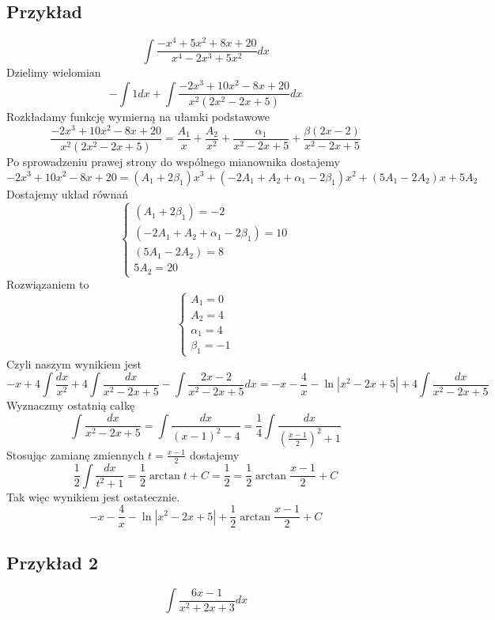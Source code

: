 \documentclass[11pt]{article}
\begin{document}
\subsection{Przykład}
$$\int \frac{-x^4 + 5x^2 + 8x + 20}{x^4 - 2x^3 + 5x^2}dx$$
Dzielimy wielomian
$$-\int1dx + \int \frac{-2x^3 + 10x^2 - 8x +20}{x^2(2x^2 -2x +5)}dx $$
Rozkładamy funkcję wymierną na ułamki podstawowe
$$\frac{-2x^3 + 10x^2 - 8x +20}{x^2(2x^2 -2x +5)} = \frac{A_1}{x} + \frac{A_2}{x^2} + \frac{\alpha_1}{x^2-2x+5} + \frac{\beta(2x-2)}{x^2-2x+5} $$
Po sprowadzeniu prawej strony do wspólnego mianownika
dostajemy
$$-2x^3+10x^2-8x+20 = (A_1 +2\beta_1)x^3 + (-2A_1 + A_2 + \alpha_1 - 2\beta_1)x^2 + (5A_1-2A_2)x + 5A_2$$
Dostajemy układ równań
\begin{displaymath}
\begin{cases}
(A_1 +2\beta_1) = -2\\
(-2A_1 + A_2 + \alpha_1 - 2\beta_1) = 10 \\
(5A_1-2A_2) = 8 \\
 5A_2 = 20
\end{cases}
\end{displaymath}
Rozwiązaniem to 
\begin{displaymath}
\begin{cases}
A_1 = 0\\
A_2 = 4 \\
\alpha_1 = 4 \\
\beta_1 = -1
\end{cases}
\end{displaymath}
Czyli naszym wynikiem jest
$$-x + 4\int \frac{dx}{x^2}+4\int \frac{dx}{x^2-2x+5}-\int \frac{2x-2}{x^2-2x+5}dx = -x -\frac{4}{x} - \ln{|x^2-2x+5|} + 4\int \frac{dx}{x^2-2x + 5}$$
Wyznaczmy ostatnią całkę 
$$\int \frac{dx}{x^2-2x + 5} = \int \frac{dx}{(x-1)^2-4} = \frac{1}{4}\int \frac{dx}{(\frac{x-1}{2})^2+1}$$
Stosując zamianę zmiennych $t = \frac{x-1}{2}$ dostajemy
$$\frac{1}{2}\int\frac{dx}{t^2+1} = \frac{1}{2}\arctan{t} + C = \frac{1}{2} = \frac{1}{2}\arctan{\frac{x-1}{2}} + C $$
Tak więc wynikiem jest ostatecznie.
$$-x -\frac{4}{x} - \ln{|x^2-2x+5|} + \frac{1}{2}\arctan{\frac{x-1}{2}} + C $$

\subsection{Przykład 2}
$$\int \frac{6x-1}{x^2+2x+3}dx  $$
\end{document}
